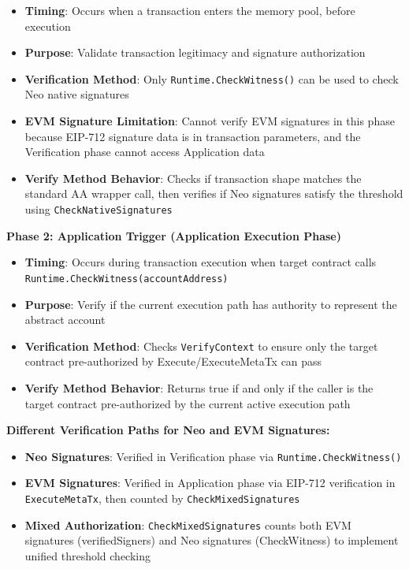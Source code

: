 \documentclass[10pt,twocolumn]{article}
\newcommand{\code}[1]{\texttt{\small #1}}
\begin{document}
{\begin{itemize}[leftmargin=*,topsep=2pt,itemsep=1pt]
\item \textbf{Timing}: Occurs when a transaction enters the memory pool, before execution
\item \textbf{Purpose}: Validate transaction legitimacy and signature authorization
\item \textbf{Verification Method}: Only \code{Runtime.CheckWitness()} can be used to check Neo native signatures
\item \textbf{EVM Signature Limitation}: Cannot verify EVM signatures in this phase because EIP-712 signature data is in transaction parameters, and the Verification phase cannot access Application data
\item \textbf{Verify Method Behavior}: Checks if transaction shape matches the standard AA wrapper call, then verifies if Neo signatures satisfy the threshold using \code{CheckNativeSignatures}
\end{itemize}

\textbf{Phase 2: Application Trigger (Application Execution Phase)}

\begin{itemize}[leftmargin=*,topsep=2pt,itemsep=1pt]
\item \textbf{Timing}: Occurs during transaction execution when target contract calls \code{Runtime.CheckWitness(accountAddress)}
\item \textbf{Purpose}: Verify if the current execution path has authority to represent the abstract account
\item \textbf{Verification Method}: Checks \code{VerifyContext} to ensure only the target contract pre-authorized by Execute/ExecuteMetaTx can pass
\item \textbf{Verify Method Behavior}: Returns true if and only if the caller is the target contract pre-authorized by the current active execution path
\end{itemize}

\textbf{Different Verification Paths for Neo and EVM Signatures:}

\begin{itemize}[leftmargin=*,topsep=2pt,itemsep=1pt]
\item \textbf{Neo Signatures}: Verified in Verification phase via \code{Runtime.CheckWitness()}
\item \textbf{EVM Signatures}: Verified in Application phase via EIP-712 verification in \code{ExecuteMetaTx}, then counted by \code{CheckMixedSignatures}
\item \textbf{Mixed Authorization}: \code{CheckMixedSignatures} counts both EVM signatures (verifiedSigners) and Neo signatures (CheckWitness) to implement unified threshold checking
\end{itemize}


}
\end{document}
